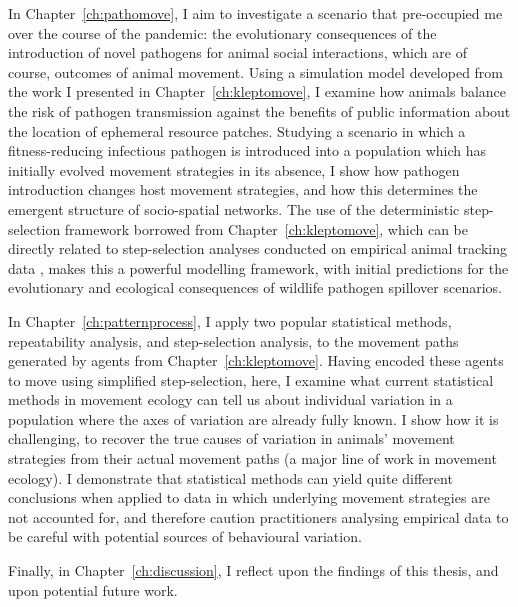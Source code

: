 In Chapter~\ref{ch:pathomove}, I aim to investigate a scenario that pre-occupied me over the course of the pandemic: the evolutionary consequences of the introduction of novel pathogens for animal social interactions, which are of course, outcomes of animal movement.
Using a simulation model developed from the work I presented in Chapter~\ref{ch:kleptomove}, I examine how animals balance the risk of pathogen transmission against the benefits of public information about the location of ephemeral resource patches.
Studying a scenario in which a fitness-reducing infectious pathogen is introduced into a population which has initially evolved movement strategies in its absence, I show how pathogen introduction changes host movement strategies, and how this determines the emergent structure of socio-spatial networks.
The use of the deterministic step-selection framework borrowed from Chapter~\ref{ch:kleptomove}, which can be directly related to step-selection analyses conducted on empirical animal tracking data \parencite{bastille-rousseau2019}, makes this a powerful modelling framework, with initial predictions for the evolutionary and ecological consequences of wildlife pathogen spillover scenarios.

In Chapter~\ref{ch:patternprocess}, I apply two popular statistical methods, repeatability analysis, and step-selection analysis, to the movement paths generated by agents from Chapter~\ref{ch:kleptomove}.
Having encoded these agents to move using simplified step-selection, here, I examine what current statistical methods in movement ecology can tell us about individual variation in a population where the axes of variation are already fully known.
I show how it is challenging, to recover the true causes of variation in animals' movement strategies from their actual movement paths (a major line of work in movement ecology).
I demonstrate that statistical methods can yield quite different conclusions when applied to data in which underlying movement strategies are not accounted for, and therefore caution practitioners analysing empirical data to be careful with potential sources of behavioural variation.

Finally, in Chapter~\ref{ch:discussion}, I reflect upon the findings of this thesis, and upon potential future work.

{ \begin{center}  \end{center} }


\clearpage
